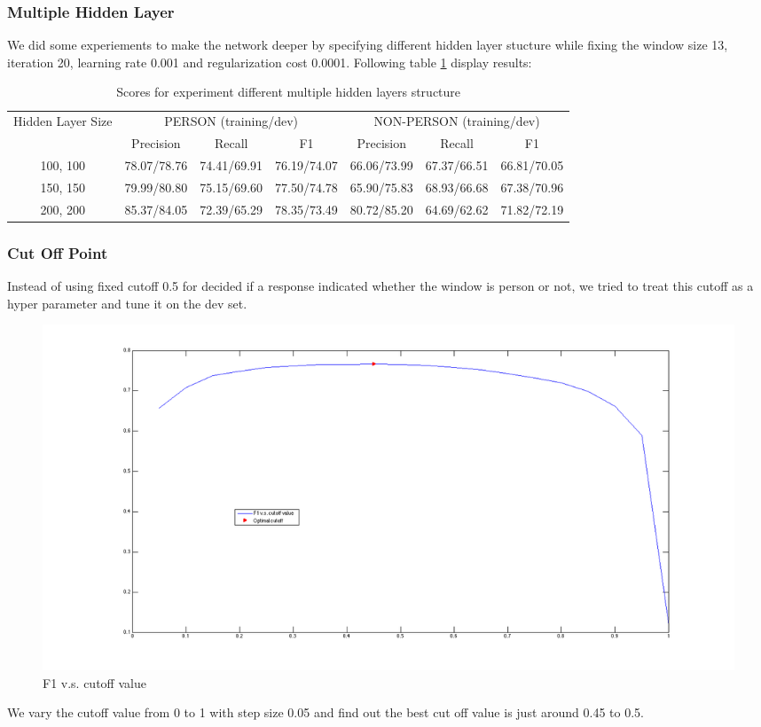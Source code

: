 \documentclass[letterpaper]{article}
\begin{document}
\subsubsection{Multiple Hidden Layer}
We did some experiements to make the network deeper by specifying different hidden layer stucture while fixing the window size 13, iteration 20, learning rate 0.001 and regularization cost 0.0001. Following table \ref{tab:multihidden} display results:
\begin{table}[h]
\begin{center}
\begin{tabular}{|c|c|c|c|c|c|c|}
\hline
\multirow{2}{*}{Hidden Layer Size} & 
\multicolumn{3}{c|}{PERSON (training/dev)} & \multicolumn{3}{c|}{NON-PERSON (training/dev)} \\
\hhline{~------}
& Precision & Recall & F1 & Precision & Recall & F1 \\
\hline
100, 100 & 78.07/78.76 & 74.41/69.91 & 76.19/74.07 
& 66.06/73.99 & 67.37/66.51 & 66.81/70.05 \\
\hline
150, 150 & 79.99/80.80 & 75.15/69.60 & 77.50/74.78 
& 65.90/75.83 & 68.93/66.68 & 67.38/70.96 \\
\hline
200, 200 & 85.37/84.05 & 72.39/65.29 & 78.35/73.49
& 80.72/85.20 & 64.69/62.62 & 71.82/72.19 \\
\hline
\end{tabular}
\caption{Scores for experiment different multiple hidden layers structure}
\label{tab:multihidden}
\end{center}
\end{table}
\subsubsection{Cut Off Point}
Instead of using fixed cutoff 0.5 for decided if a response indicated whether the window is person or not, we tried to treat this cutoff as a hyper parameter and tune it on the dev set.
\begin{figure}[ht]
\begin{center}
\includegraphics[scale=0.2]{f1.png}
\caption{F1 v.s. cutoff value}
\label{fig:cutoff}
\end{center}
\end{figure}
We vary the cutoff value from 0 to 1 with step size 0.05 and find out the best cut off value is just around 0.45 to 0.5. 
\end{document}
